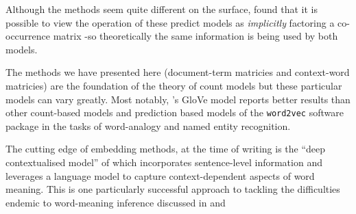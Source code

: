 Although the methods seem quite different on the surface, \textcite{levy-2014-neural-WE-as} found that it is possible to view the operation of these predict models as \emph{implicitly} factoring a co-occurrence matrix -so theoretically the same information is being used by both models.

The methods we have presented here (document-term matricies and context-word matricies) are the foundation of the theory of count models but these particular models can vary greatly. Most notably, \citeauthor{pennington2014glove}'s \parencite*{pennington2014glove} GloVe model reports better results than other count-based models and prediction based models of the \texttt{word2vec} software package in the tasks of word-analogy and named entity recognition.

The cutting edge of embedding methods, at the time of writing is the ``deep contextualised model'' of \textcite{peters18-deep-contex-word-repres} which incorporates sentence-level information and leverages a language model to capture context-dependent aspects of word meaning. This is one particularly successful approach to tackling the difficulties endemic to word-meaning inference discussed in  and 

